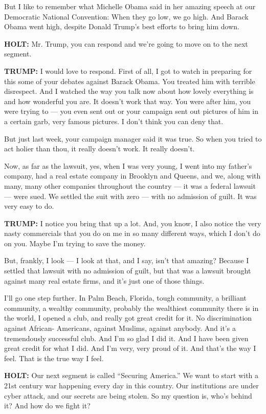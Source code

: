 But I like to remember what Michelle Obama said in her amazing speech at
our Democratic National Convention: When they go low, we go high. And
Barack Obama went high, despite Donald Trump's best efforts to bring him
down.

\textbf{HOLT:} Mr. Trump, you can respond and we're going to move on to
the next segment.

\textbf{TRUMP:} I would love to respond. First of all, I got to watch in
preparing for this some of your debates against Barack Obama. You
treated him with terrible disrespect. And I watched the way you talk now
about how lovely everything is and how wonderful you are. It doesn't
work that way. You were after him, you were trying to --- you even sent
out or your campaign sent out pictures of him in a certain garb, very
famous pictures. I don't think you can deny that.

But just last week, your campaign manager said it was true. So when you
tried to act holier than thou, it really doesn't work. It really
doesn't.

Now, as far as the lawsuit, yes, when I was very young, I went into my
father's company, had a real estate company in Brooklyn and Queens, and
we, along with many, many other companies throughout the country --- it
was a federal lawsuit --- were sued. We settled the suit with zero ---
with no admission of guilt. It was very easy to do.

\textbf{TRUMP:} I notice you bring that up a lot. And, you know, I also
notice the very nasty commercials that you do on me in so many different
ways, which I don't do on you. Maybe I'm trying to save the money.

But, frankly, I look --- I look at that, and I say, isn't that amazing?
Because I settled that lawsuit with no admission of guilt, but that was
a lawsuit brought against many real estate firms, and it's just one of
those things.

I'll go one step further. In Palm Beach, Florida, tough community, a
brilliant community, a wealthy community, probably the wealthiest
community there is in the world, I opened a club, and really got great
credit for it. No discrimination against African- Americans, against
Muslims, against anybody. And it's a tremendously successful club. And
I'm so glad I did it. And I have been given great credit for what I did.
And I'm very, very proud of it. And that's the way I feel. That is the
true way I feel.

\textbf{HOLT:} Our next segment is called ``Securing America.'' We want
to start with a 21st century war happening every day in this country.
Our institutions are under cyber attack, and our secrets are being
stolen. So my question is, who's behind it? And how do we fight it?

